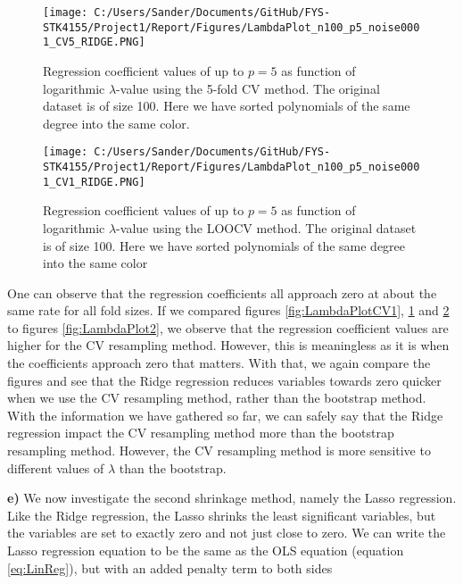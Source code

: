 \documentclass[12pt,a4paper]{article}
\begin{document}
\begin{figure}[H]
\centering
\texttt{[image: C:/Users/Sander/Documents/GitHub/FYS-STK4155/Project1/Report/Figures/LambdaPlot\_n100\_p5\_noise0001\_CV5\_RIDGE.PNG]}
\caption{\label{fig:LambdaPlotCV2} Regression coefficient values of up to $p = 5$ as function of logarithmic $\lambda$-value using the 5-fold CV method. The original dataset is of size 100. Here we have sorted polynomials of the same degree into the same color.}
\end{figure}

\begin{figure}[H]
\centering
\texttt{[image: C:/Users/Sander/Documents/GitHub/FYS-STK4155/Project1/Report/Figures/LambdaPlot\_n100\_p5\_noise0001\_CV1\_RIDGE.PNG]}
\caption{\label{fig:LambdaPlotCV3} Regression coefficient values of up to $p = 5$ as function of logarithmic $\lambda$-value using the LOOCV method. The original dataset is of size 100. Here we have sorted polynomials of the same degree into the same color}
\end{figure}

\noindent One can observe that the regression coefficients all approach zero at about the same rate for all fold sizes. If we compared figures \ref{fig:LambdaPlotCV1}, \ref{fig:LambdaPlotCV2} and \ref{fig:LambdaPlotCV3} to figures \ref{fig:LambdaPlot2}, we observe that the regression coefficient values are higher for the CV resampling method. However, this is meaningless as it is when the coefficients approach zero that matters. With that, we again compare the figures and see that the Ridge regression reduces variables towards zero quicker when we use the CV resampling method, rather than the bootstrap method.
\\
With the information we have gathered so far, we can safely say that the Ridge regression impact the CV resampling method more than the bootstrap resampling method. However, the CV resampling method is more sensitive to different values of $\lambda$ than the bootstrap. 

\newpage

\noindent \textbf{e)} We now investigate the second shrinkage method, namely the Lasso regression. Like the Ridge regression, the Lasso shrinks the least significant variables, but the variables are set to exactly zero and not just close to zero. We can write the Lasso regression equation to be the same as the OLS equation (equation \ref{eq:LinReg}), but with an added penalty term to both sides 
\end{document}
